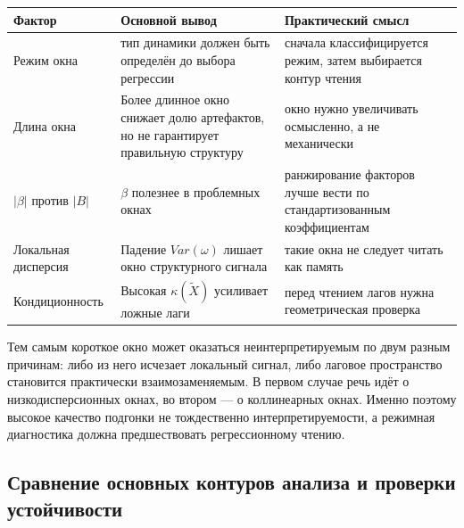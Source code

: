 {\def\LTcaptype{none} %
\begin{longtable}[]{@{}
  >{\raggedright\arraybackslash}p{}
  >{\raggedright\arraybackslash}p{}
  >{\raggedright\arraybackslash}p{}@{}}
\toprule\noalign{}
\begin{minipage}[b]{\linewidth}\raggedright
Фактор
\end{minipage} & \begin{minipage}[b]{\linewidth}\raggedright
Основной вывод
\end{minipage} & \begin{minipage}[b]{\linewidth}\raggedright
Практический смысл
\end{minipage} \\
\midrule\noalign{}
\endhead
\bottomrule\noalign{}
\endlastfoot
Режим окна & тип динамики должен быть определён до выбора регрессии & сначала классифицируется режим, затем выбирается контур чтения \\
Длина окна & Более длинное окно снижает долю артефактов, но не гарантирует правильную структуру & окно нужно увеличивать осмысленно, а не механически \\
\(|\beta|\) против \(|B|\) & \(\beta\) полезнее в проблемных окнах & ранжирование факторов лучше вести по стандартизованным коэффициентам \\
Локальная дисперсия & Падение \(Var(\omega)\) лишает окно структурного сигнала & такие окна не следует читать как память \\
Кондиционность & Высокая \(\kappa(\widetilde{X})\) усиливает ложные лаги & перед чтением лагов нужна геометрическая проверка \\
\end{longtable}
}

Тем самым короткое окно может оказаться неинтерпретируемым по двум разным причинам: либо из него исчезает локальный сигнал, либо лаговое пространство становится практически взаимозаменяемым. В первом случае речь идёт о низкодисперсионных окнах, во втором --- о коллинеарных окнах. Именно поэтому высокое качество подгонки не тождественно интерпретируемости, а режимная диагностика должна предшествовать регрессионному чтению.

\subsection{Сравнение основных контуров анализа и проверки устойчивости}
\label{sec:sravnenie-osnovnyh-konturov-analiza-i-proverki-ustoichivosti}

